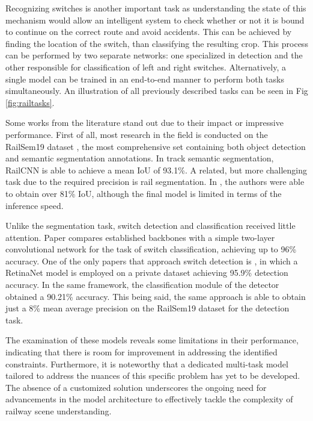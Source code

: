 \documentclass[conference]{IEEEtran}
\begin{document}
Recognizing switches is another important task as understanding the state of this mechanism would allow an intelligent system to check whether or not it is bound to continue on the correct route and avoid accidents. This can be achieved by finding the location of the switch, than classifying the resulting crop. This process can be performed by two separate networks: one specialized in detection and the other responsible for classification of left and right switches. Alternatively, a single model can be trained in an end-to-end manner to perform both tasks simultaneously. An illustration of all previously described tasks can be seen in Fig \ref{fig:railtasks}.

Some works from the literature stand out due to their impact or impressive performance. First of all, most research in the field is conducted on the RailSem19 dataset \cite{zendel2019railsem19}, the most comprehensive set containing both object detection and semantic segmentation annotations. In track semantic segmentation, RailCNN \cite{belyaev2020railroad} is able to achieve a mean IoU of 93.1\%. A related, but more challenging task due to the required precision is rail segmentation. In \cite{alexandrescu2022dynamic}, the authors were able to obtain over 81\% IoU, although the final model is limited in terms of the inference speed.

 Unlike the segmentation task, switch detection and classification received little attention. Paper \cite{switch_classification} compares established backbones with a simple two-layer convolutional network for the task of switch classification, achieving up to 96\% accuracy. One of the only papers that approach switch detection is \cite{jahan2021deep}, in which a RetinaNet model \cite{lin2017focal} is employed on a private dataset achieving 95.9\% detection accuracy. In the same framework, the classification module of the detector obtained a 90.21\% accuracy. This being said, the same approach is able to obtain just a 8\% mean average precision on the RailSem19 dataset for the detection task.

The examination of these models reveals some limitations in their performance, indicating that there is room for improvement in addressing the identified constraints. Furthermore, it is noteworthy that a dedicated multi-task model tailored to address the nuances of this specific problem has yet to be developed. The absence of a customized solution underscores the ongoing need for advancements in the model architecture to effectively tackle the complexity of railway scene understanding.
\end{document}
